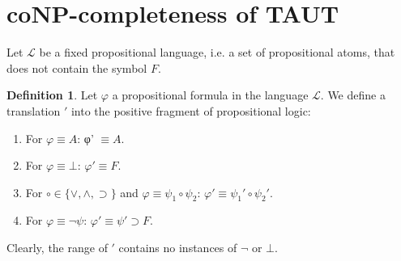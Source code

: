 \documentclass[a4paper,10pt]{article}
\newcommand{\imp}{\supset}
\renewcommand{\L}{\mathcal{L}}
\theoremstyle{definition}
\newtheorem{definition}[theorem]{Definition}
\begin{document}
\section{coNP-completeness of TAUT}

Let $\L$ be a fixed propositional language, i.e. a set of propositional atoms, that does not contain the symbol $F$.
\begin{definition}
 Let $φ$ a propositional formula in the language $\L$. We define a translation $'$ into the positive fragment of propositional logic:
 \begin{enumerate}
  \item For $φ \equiv A$: φ' $\equiv A$.
  \item For $φ \equiv \bot$: $φ' \equiv F$.
  \item For $\circ \in \{∨,∧,\imp\}$ and $φ \equiv ψ_1 \circ ψ_2$: $φ' \equiv ψ_1' \circ ψ_2'$.
  \item For $φ \equiv ¬ψ$: $φ' \equiv ψ' \imp F$.
 \end{enumerate}
\end{definition}

Clearly, the range of $'$ contains no instances of $¬$ or $\bot$.
\end{document}
